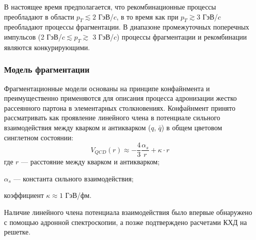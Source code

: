 В настоящее время предполагается, что рекомбинационные процессы преобладают в области $p_T \lesssim 2$ ГэВ/$c$, в то время как при $p_T \gtrsim 3$ ГэВ/$c$ преобладают процессы фрагментации. В диапазоне промежуточных поперечных импульсов (2 ГэВ/$c \lesssim p_T \gtrsim $ 3 ГэВ/$c$) процессы фрагментации и рекомбинации являются конкурирующими.

\subsubsection{Модель фрагментации} \label{ch1/fragmentation}
Фрагментационные модели основаны на принципе конфайнмента и преимущественно применяются для описания процесса адронизации жестко рассеянного партона в элементарных столкновениях. 
%
Конфайнмент принято рассматривать \cite{FragmentationLund} как проявление линейного члена в потенциале сильного взаимодействия между кварком и антикварком ($q$, $\bar{q}$) в общем цветовом синглетном состоянии:
$$ V_{QCD}(r) \approx -\frac{4}{3} \frac{\alpha_s}{r} +\kappa \cdot r$$
где $r$ — расстояние между кварком и антикварком;

$\alpha_{s}$ — константа сильного взаимодействия;

коэффициент $\kappa \approx 1$ ГэВ/фм.

Наличие линейного члена потенциала взаимодействия было впервые обнаружено с помощью адронной спектроскопии, а позже подтверждено расчетами КХД на решетке. 

